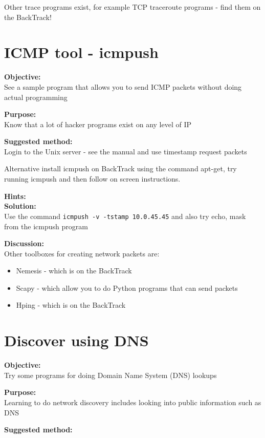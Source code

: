 \documentclass[a4paper,11pt,notitlepage]{report}
\begin{document}
Other trace programs exist, for example TCP traceroute programs - find them on the BackTrack!

\chapter{ICMP tool - icmpush}
\label{ex:icmpush}

{\bf Objective:} \\
See a sample program that allows you to send ICMP packets without doing actual programming

{\bf Purpose:}\\
Know that a lot of hacker programs exist on any level of IP

{\bf Suggested method:} \\
Login to the Unix server - see the manual and use timestamp request packets

Alternative install icmpush on BackTrack using the command apt-get, try running icmpush and
then follow on screen instructions.

{\bf Hints:} \\

{\bf Solution:}\\
Use the command \verb+icmpush -v -tstamp 10.0.45.45+
and also try echo, mask from the icmpush program

{\bf Discussion:}\\
Other toolboxes for creating network packets are:
\begin{itemize}
\item Nemesis - which is on the BackTrack
\item Scapy - which allow you to do Python programs that can send packets
\item Hping - which is on the BackTrack
\end{itemize}


\chapter{Discover using DNS}
\label{ex:basic-dns-lookup}

{\bf Objective:}\\
Try some programs for doing Domain Name System (DNS) lookups

{\bf Purpose:}\\
Learning to do network discovery includes looking into public information such as DNS

{\bf Suggested method:}\\
\end{document}
